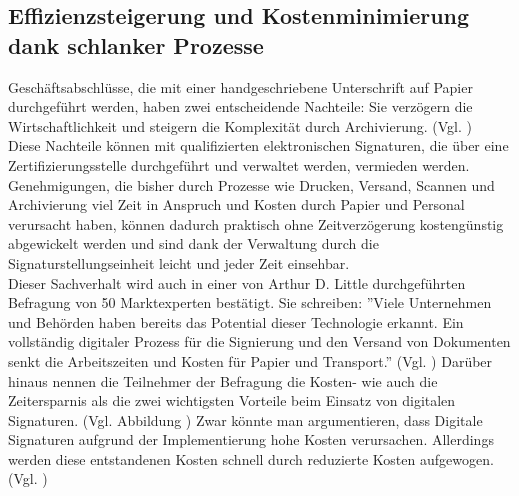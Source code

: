 \documentclass[deutsch]{lib/llncs/llncs}
\begin{document}
\subsection{Effizienzsteigerung und Kostenminimierung dank schlanker Prozesse}
Geschäftsabschlüsse, die mit einer handgeschriebene Unterschrift auf Papier durchgeführt werden, haben zwei entscheidende Nachteile: Sie verzögern die Wirtschaftlichkeit und steigern die Komplexität durch Archivierung. (Vgl. \cite[S. 3]{Zitat05})\\
Diese Nachteile können mit qualifizierten elektronischen Signaturen, die über eine Zertifizierungsstelle durchgeführt und verwaltet werden, vermieden werden. Genehmigungen, die bisher durch Prozesse wie Drucken, Versand, Scannen und Archivierung viel Zeit in Anspruch und Kosten durch Papier und Personal verursacht haben, können dadurch praktisch ohne Zeitverzögerung kostengünstig abgewickelt werden und sind dank der Verwaltung durch die Signaturstellungseinheit leicht und jeder Zeit einsehbar. \\
Dieser Sachverhalt wird auch in einer von Arthur D. Little durchgeführten Befragung von 50 Marktexperten bestätigt. Sie schreiben: ''Viele Unternehmen und Behörden haben bereits das Potential dieser Technologie erkannt. Ein vollständig digitaler Prozess für die Signierung und den Versand von Dokumenten senkt die Arbeitszeiten und Kosten für Papier und Transport.'' (Vgl. \cite[S. 7]{Zitat05})
Darüber hinaus nennen die Teilnehmer der Befragung die Kosten- wie auch die Zeitersparnis als die zwei wichtigsten Vorteile beim Einsatz von digitalen Signaturen. (Vgl. Abbildung \cite[S. 7]{Zitat05})
Zwar könnte man argumentieren, dass Digitale Signaturen aufgrund der Implementierung hohe Kosten verursachen. Allerdings werden diese entstandenen Kosten schnell durch reduzierte Kosten aufgewogen. (Vgl. \cite[S. 7]{Zitat05})
\end{document}
